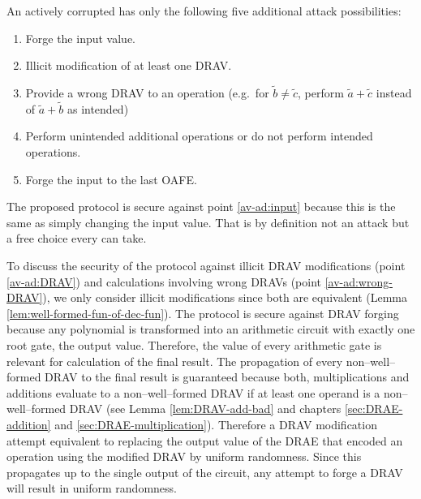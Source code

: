 An actively corrupted \JWpTwo{} has only the following five additional attack
possibilities:

\begin{enumerate}

\item \label{av-ad:input} Forge the input value.

\item \label{av-ad:DRAV} Illicit modification of at least one DRAV.

\item \label{av-ad:wrong-DRAV} Provide a wrong DRAV to an operation (e.g.\ for
  $\widetilde{b} \neq \widetilde{c}$, perform $\widetilde{a} + \widetilde{c}$
  instead of $\widetilde{a} + \widetilde{b}$ as intended)

\item \label{av-ad:other-ops} Perform unintended additional operations or do not
  perform intended operations.

\item \label{av-ad:last-OAFE} Forge the input to the last OAFE.

\end{enumerate}


The proposed protocol is secure against point \ref{av-ad:input} because this is
the same as simply changing the input value. That is by definition not an attack
but a free choice every \JWpTwo{} can take.

To discuss the security of the protocol against illicit DRAV modifications
(point \ref{av-ad:DRAV}) and calculations involving wrong DRAVs (point
\ref{av-ad:wrong-DRAV}), we only consider illicit modifications since both are
equivalent (Lemma \ref{lem:well-formed-fun-of-dec-fun}). The protocol is secure
against DRAV forging because any polynomial is transformed into an arithmetic
circuit with exactly one root gate, the output value. Therefore, the value of
every arithmetic gate is relevant for calculation of the final result. The
propagation of every non--well--formed DRAV to the final result is guaranteed
because both, multiplications and additions evaluate to a non--well--formed DRAV
if at least one operand is a non--well--formed DRAV (see Lemma
\ref{lem:DRAV-add-bad} and chapters \ref{sec:DRAE-addition} and
\ref{sec:DRAE-multiplication}). Therefore a DRAV modification attempt equivalent
to replacing the output value of the DRAE that encoded an operation using the
modified DRAV by uniform randomness. Since this propagates up to the single
output of the circuit, any attempt to forge a DRAV will result in uniform
randomness.


